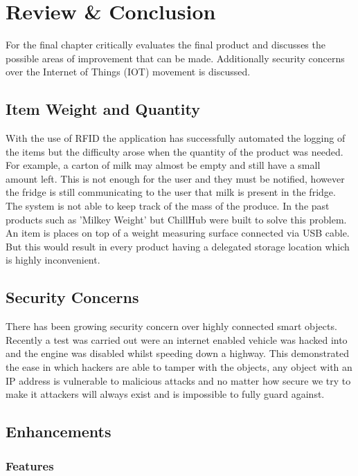 \documentclass[a4paper, 11pt]{article}
\begin{document}
\clearpage
\section{Review \& Conclusion}
For the final chapter critically evaluates the final product and discusses the possible areas of improvement that can be made. Additionally security concerns over the Internet of Things (IOT) movement is discussed. 

\subsection{Item Weight and Quantity} With the use of RFID the application has successfully automated the logging of the items but the difficulty arose when the quantity of the product was needed. For example, a carton of milk may almost be empty and still have a small amount left. This is not enough for the user and they must be notified, however the fridge is still communicating to the user that milk is present in the fridge. The system is not able to keep track of the mass of the produce. In the past products such as 'Milkey Weight' but ChillHub were built to solve this problem. An item is places on top of a weight measuring surface connected via USB cable. But this would result in every product having a delegated storage location which is highly inconvenient.\cite{milky}  

\subsection{Security Concerns} There has been growing security concern over highly connected smart objects. Recently a test was carried out were an internet enabled vehicle was hacked into and the engine was disabled whilst speeding down a highway. \cite{jeep} This demonstrated the ease in which hackers are able to tamper with the objects, any object with an IP address is vulnerable to malicious attacks and no matter how secure we try to make it attackers will always exist and is impossible to fully guard against.  

\subsection{Enhancements}
\subsubsection{Features}
\end{document}
